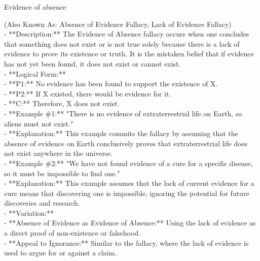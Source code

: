 \documentclass[a4paper,12pt,single,pdftex]{scrbook}
\begin{document}
Evidence of absence
    
      (Also Known As: Absence of Evidence Fallacy, Lack of Evidence Fallacy)
    \\

  
    
      - **Description:** The Evidence of Absence fallacy occurs when one concludes that something does not exist or is not true solely because there is a lack of evidence to prove its existence or truth. It is the mistaken belief that if evidence has not yet been found, it does not exist or cannot exist.
    \\

    
      - **Logical Form:**
    \\

    
        - **P1:** No evidence has been found to support the existence of X.
    \\

    
        - **P2:** If X existed, there would be evidence for it.
    \\

    
        - **C:** Therefore, X does not exist.
    \\

    
      - **Example \#1:** "There is no evidence of extraterrestrial life on Earth, so aliens must not exist."
    \\

    
      - **Explanation:** This example commits the fallacy by assuming that the absence of evidence on Earth conclusively proves that extraterrestrial life does not exist anywhere in the universe.
    \\

    
      - **Example \#2:** "We have not found evidence of a cure for a specific disease, so it must be impossible to find one."
    \\

    
      - **Explanation:** This example assumes that the lack of current evidence for a cure means that discovering one is impossible, ignoring the potential for future discoveries and research.
    \\

    
      - **Variation:**
    \\

    
        - **Absence of Evidence as Evidence of Absence:** Using the lack of evidence as a direct proof of non-existence or falsehood.
    \\

    
        - **Appeal to Ignorance:** Similar to the fallacy, where the lack of evidence is used to argue for or against a claim.
    \\
\end{document}
